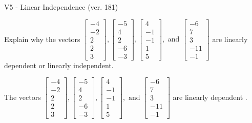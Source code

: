 \begin{exercise}
  \begin{exerciseTitle}V5 - Linear Independence (ver. 181)\end{exerciseTitle}
  \begin{exerciseStatement}
    Explain why the vectors \(\left[\begin{array}{r}
-4 \\
-2 \\
2 \\
2 \\
3
\end{array}\right] , \left[\begin{array}{r}
-5 \\
4 \\
2 \\
-6 \\
-3
\end{array}\right] , \left[\begin{array}{r}
4 \\
-1 \\
-1 \\
1 \\
5
\end{array}\right] , \text{ and } \left[\begin{array}{r}
-6 \\
7 \\
3 \\
-11 \\
-1
\end{array}\right]\) are linearly dependent or linearly independent.	


  \end{exerciseStatement}
  \begin{exerciseAnswer}
   The vectors \(\left[\begin{array}{r}
-4 \\
-2 \\
2 \\
2 \\
3
\end{array}\right] , \left[\begin{array}{r}
-5 \\
4 \\
2 \\
-6 \\
-3
\end{array}\right] , \left[\begin{array}{r}
4 \\
-1 \\
-1 \\
1 \\
5
\end{array}\right] , \text{ and } \left[\begin{array}{r}
-6 \\
7 \\
3 \\
-11 \\
-1
\end{array}\right]\) are 
  	 linearly dependent  .
  


  \end{exerciseAnswer}
\end{exercise}